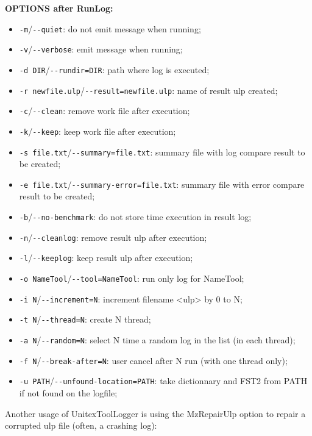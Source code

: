 \bigskip
\noindent \textbf{OPTIONS after RunLog:}
\begin{itemize}
  \item \verb+-m+/\verb+--quiet+: do not emit message when running;
  \item \verb+-v+/\verb+--verbose+: emit message when running;
  
  \item \verb+-d DIR+/\verb+--rundir=DIR+: path where log is executed;
  \item \verb+-r newfile.ulp+/\verb+--result=newfile.ulp+: name of result ulp created;

  \item \verb+-c+/\verb+--clean+: remove work file after execution;
  \item \verb+-k+/\verb+--keep+: keep work file after execution;

  \item \verb+-s file.txt+/\verb+--summary=file.txt+: summary file with log compare result to be created;
  \item \verb+-e file.txt+/\verb+--summary-error=file.txt+: summary file with error compare result to be created;

  \item \verb+-b+/\verb+--no-benchmark+: do not store time execution in result log;

  \item \verb+-n+/\verb+--cleanlog+: remove result ulp after execution;
  \item \verb+-l+/\verb+--keeplog+: keep result ulp after execution;

  \item \verb+-o NameTool+/\verb+--tool=NameTool+: run only log for NameTool;
  \item \verb+-i N+/\verb+--increment=N+: increment filename <ulp> by 0 to N;
  \item \verb+-t N+/\verb+--thread=N+: create N thread;
  \item \verb+-a N+/\verb+--random=N+: select N time a random log in the list (in each thread);
  \item \verb+-f N+/\verb+--break-after=N+: user cancel after N run (with one thread only);

  \item \verb+-u PATH+/\verb+--unfound-location=PATH+: take dictionnary and FST2 from PATH if not found on the logfile;
\end{itemize}


Another usage of UnitexToolLogger is using the MzRepairUlp option to repair a corrupted ulp file (often, a crashing log):

